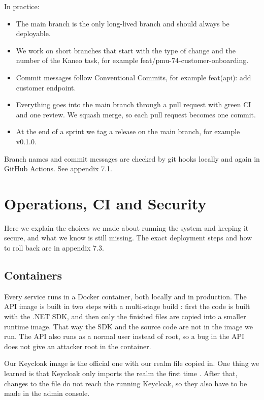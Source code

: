 \documentclass[a4paper,11pt]{article}
\begin{document}
In practice:
\begin{itemize}
    \item The main branch is the only long-lived branch and should always be deployable.
    \item We work on short branches that start with the type of change and the number of the Kaneo task, for example feat/pmu-74-customer-onboarding.
    \item Commit messages follow Conventional Commits, for example feat(api): add customer endpoint.
    \item Everything goes into the main branch through a pull request with green CI and one review. We squash merge, so each pull request becomes one commit.
    \item At the end of a sprint we tag a release on the main branch, for example v0.1.0.
\end{itemize}
Branch names and commit messages are checked by git hooks locally and again in GitHub Actions. See appendix 7.1.

\section{Operations, CI and Security}
\label{sec:ops}
Here we explain the choices we made about running the system and keeping it secure, and what we know is still missing. The exact deployment steps and how to roll back are in appendix 7.3.

\subsection{Containers}
Every service runs in a Docker container, both locally and in production. The API image is built in two steps with a multi-stage build \cite{docker-multi-stage-builds}\cite{microsoft-aspnetcore-docker}: first the code is built with the .NET SDK, and then only the finished files are copied into a smaller runtime image. That way the SDK and the source code are not in the image we run. The API also runs as a normal user instead of root, so a bug in the API does not give an attacker root in the container.

Our Keycloak image is the official one with our realm file copied in. One thing we learned is that Keycloak only imports the realm the first time \cite[sec.~Importing a realm during startup]{keycloak-import-export}. After that, changes to the file do not reach the running Keycloak, so they also have to be made in the admin console.
\end{document}
